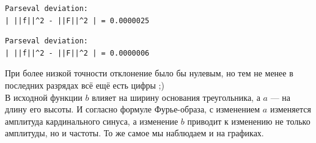 \documentclass[a4paper]{article}
\begin{document}
\begin{minipage}{0.33\textwidth}
\begin{lstlisting}[caption={$a = 2$, $b = 1$}, numbers=none]
Parseval deviation:
| ||f||^2 - ||F||^2 | = 0.0000025
\end{lstlisting}
\end{minipage}\hfill
\begin{minipage}{0.33\textwidth}
\begin{lstlisting}[caption={$a = 2$, $b = 2$}, numbers=none]
Parseval deviation:
| ||f||^2 - ||F||^2 | = 0.0000006
\end{lstlisting}
\end{minipage}
При более низкой точности отклонение было бы нулевым, но тем не менее в последних разрядах всё ещё есть цифры ;)\\[0.5em]
В исходной функции $b$ влияет на ширину основания треугольника, а $a$ --- на длину его высоты. И согласно формуле Фурье-образа, с изменением $a$ изменяется амплитуда кардинального синуса, а изменение $b$ приводит к изменению не только амплитуды, но и частоты. То же самое мы наблюдаем и на графиках.
\end{document}
